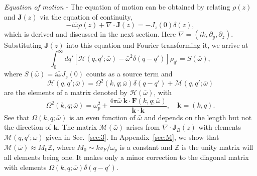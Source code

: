 \documentclass[aps,reprint]{revtex4-1}
\begin{document}
\textit{Equation of motion} - The equation of motion can be obtained by relating $\rho(z)$ and $\mathbf{J}(z)$ via the equation of continuity, 
\begin{equation}
-i\bar{\omega}\rho(z) + \nabla\cdot\mathbf{J}(z) = -J_z(0)\delta(z), \label{eocc}
\end{equation}
which is derived and discussed in the next section. Here $\nabla = (ik,\partial_y,\partial_z)$. Substituting $\mathbf{J}(z)$ into this equation and Fourier transforming it, we arrive at
\begin{equation}
\int^{\infty}_0dq'\left[\mathcal{H}(q,q';\bar{\omega})-\bar{\omega}^2\delta(q-q')\right]\rho_{q'} = S(\bar{\omega}), \label{eom}
\end{equation} 
where $S(\bar{\omega})= i\bar{\omega}J_z(0)$ counts as a source term and $$\mathcal{H}(q,q';\bar{\omega}) = \Omega^2(k,q;\bar{\omega})\delta(q-q')+\mathcal{M}(q,q';\bar{\omega})$$ are the elements of a matrix denoted by $\mathcal{H}(\bar{\omega})$, with
\begin{equation}
\Omega^2(k,q;\bar{\omega}) = \omega^2_p + \frac{4\pi \bar{\omega} ~\mathbf{k}\cdot\mathbf{F}(k,q;\bar{\omega})}{\mathbf{k}\cdot\mathbf{k}}, \quad \mathbf{k} = (k,q). \label{Omega}
\end{equation}
See that $\Omega(k,q;\bar{\omega})$ is an even function of $\bar{\omega}$ and depends on the length but not the direction of $\mathbf{k}$. The matrix $\mathcal{M}(\bar{\omega})$ arises from $\nabla\cdot\mathbf{J}_{B}(z)$ with elements $\mathcal{M}(q,q';\bar{\omega})$ given in Sec.~\ref{sec:3}. In Appendix~\ref{sec:M}, we show that $\mathcal{M}(\bar{\omega}) \approx M_0\mathbb{Z}$, where $M_0 \sim kv_F/\omega_p$ is a constant and $\mathbb{Z}$ is the unity matrix will all elements being one. It makes only a minor correction to the diagonal matrix with elements $\Omega(k,q;\bar{\omega})\delta(q-q')$. 
\end{document}
